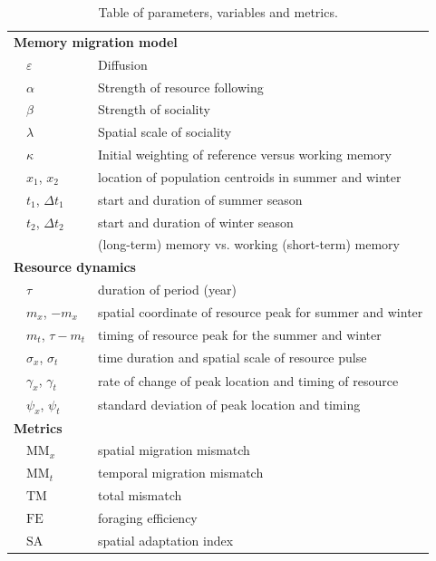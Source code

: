 \documentclass[utf8]{frontiersSCNS} %
\begin{document}
	\begin{table}[b!]
		\caption{\label{table_definitions} Table of parameters, variables and metrics.}
		
		\centering
		\begin{tabular}{ll|l}
			\hline\hline
			\multicolumn{3}{l}{\textbf{Memory migration model}}\\ 
			& $\varepsilon$ & Diffusion \\ 
			& $\alpha$ & Strength of resource following \\ 
			& $\beta$ & Strength of sociality \\ 
			& $\lambda$ & Spatial scale of sociality \\ 
			& $\kappa$ & Initial weighting of reference versus working memory \\ 
			& $x_1$, $x_2$ & location of population centroids in summer and winter \\ 
			& $t_1$, $\Delta t_1$ & start and duration of summer season \\ 
			& $t_2$, $\Delta t_2$ & start and duration of winter season \\ 
			&& (long-term) memory vs. working (short-term) memory \\ 
			\multicolumn{3}{l}{\textbf{Resource dynamics}} \\ 
			& $\tau$ & duration of period (year) \\ 
			& $m_x$, $-m_x$ & spatial coordinate of resource peak for summer and winter \\ 
			& $m_t$, $\tau - m_t$ & timing of resource peak for the summer and winter \\ 
			& $\sigma_x$, $\sigma_t$ & time duration and spatial scale of resource pulse \\ 
			& $\gamma_x$, $\gamma_t$ & rate of change of peak location and timing of resource \\ 
			& $\psi_x$, $\psi_t$ & standard deviation of peak location and timing \\ 
			\multicolumn{3}{l}{\textbf{Metrics}}\\ 
			& $\text{MM}_x$ & spatial migration mismatch \\ 
			& $\text{MM}_t$ & temporal migration mismatch \\ 
			& $\text{TM}$ & total mismatch \\ 
			& $\text{FE}$ & foraging efficiency \\ 
			& $\text{SA}$ & spatial adaptation index \\ 
			\hline\hline
		\end{tabular}
	\end{table}
	
\end{document}
